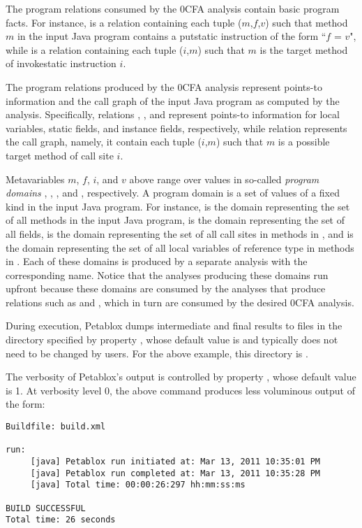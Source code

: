 The program relations consumed by the 0CFA analysis contain basic program facts.
For instance,  is a relation containing each tuple
($m$,$f$,$v$) such that method $m$ in the input Java program contains a
putstatic instruction of the form ``$f$ = $v$", while  is a
relation containing each tuple ($i$,$m$) such that $m$ is the target method of
invokestatic instruction $i$.

The program relations produced by the 0CFA analysis represent points-to
information and the call graph of the input Java program as computed by the
analysis.  Specifically, relations , , and 
represent points-to information for local variables, static fields, and instance
fields, respectively, while relation  represents the call graph,
namely, it contain each tuple ($i$,$m$) such that $m$ is a possible target
method of call site $i$.

Metavariables $m$, $f$, $i$, and $v$ above range over values in so-called
{\it program domains} , , , and , respectively.
A program domain is a set of values of a fixed kind in the input Java
program.  For instance,  is the domain representing the set of all
methods in the input Java program,  is the domain representing the set
of all fields,  is the domain representing the set of all call sites in
methods in , and  is the domain representing the set of all
local variables of reference type in methods in .  Each of these domains
is produced by a separate analysis with the corresponding name.  Notice
that the analyses producing these domains run upfront because these domains are
consumed by the analyses that produce relations such as 
and , which in turn are consumed by the desired 0CFA analysis.

During execution, Petablox dumps intermediate and final results to files in the
directory specified by property , whose default value is
 and typically does not need to be changed
by users.  For the above example, this directory is
.

The verbosity of Petablox's output is controlled by property
, whose default value is 1.  At verbosity level 0, the above
command produces less voluminous output of the form:

\begin{framed}
{\small
\begin{verbatim}
Buildfile: build.xml

run:
     [java] Petablox run initiated at: Mar 13, 2011 10:35:01 PM
     [java] Petablox run completed at: Mar 13, 2011 10:35:28 PM
     [java] Total time: 00:00:26:297 hh:mm:ss:ms

BUILD SUCCESSFUL
Total time: 26 seconds
\end{verbatim}
}
\end{framed}

